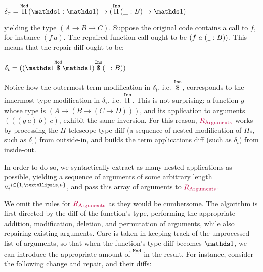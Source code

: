 \noindent%
%
$\delta_{\tau} = \MathModPi{\MathSame}{\MathSame}{(\MathInsPi{B}{\_}{\MathSame})}$

\noindent%
%
yielding the type $(A \rightarrow B \rightarrow C)$.  Suppose the original code
contains a call to $f$, for instance $(f\ a)$.  The repaired function call ought
to be $(f\ a\ (\MathAnnot{\MathHole}{B}))$.  This means that the repair diff
ought to be:

\noindent%
%
$\delta_{t} = (\MathInsApp{(\MathModApp{\MathSame}{\MathSame})}{(\MathAnnot{\MathHole}{B})})$

\noindent%
%
Notice how the outermost term modification in $\delta_{t}$,
i.e. $\overset{\mathtt{Ins}}{\$}{}$, corresponds to the innermost type modification in
$\delta_{\tau}$, i.e.  $\overset{\mathtt{Ins}}{\Pi}{}$.  This is not surprising: a function $g$
whose type is $(A \rightarrow (B \rightarrow (C \rightarrow D)))$, and its
application to arguments $(((g\ a)\ b)\ c)$, exhibit the same inversion.  For
this reason, $\textcolor{purple}{R_{\text{Arguments}}}{}$ works by processing the $\Pi$-telescope type diff
(a sequence of nested modification of $\Pi$s, such as $\delta_{\tau}$) from
outside-in, and builds the term applications diff (such as $\delta_{t}$) from
inside-out.

In order to do so, we syntactically extract as many nested applications as
possible, yielding a sequence of arguments of some arbitrary length
$\range{n}{a_{i}}$, and pass this array of arguments to $\textcolor{purple}{R_{\text{Arguments}}}{}$.

We omit the rules for $\textcolor{purple}{R_{\text{Arguments}}}{}$ as they would be cumbersome.  The
algorithm is first directed by the diff of the function's type, performing the
appropriate addition, modification, deletion, and permutation of arguments,
while also repairing existing arguments.  Care is taken in keeping track of the
unprocessed list of arguments, so that when the function's type diff becomes
$\MathSame{}$, we can introduce the appropriate amount of $\overset{\mathtt{Mod}}{::}$ in the
result.  For instance, consider the following change and repair, and their
diffs:

